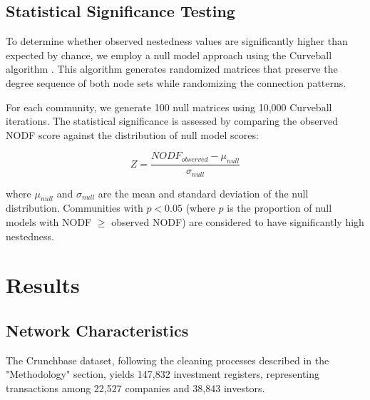 \documentclass[12pt]{article}
\begin{document}
\subsection{Statistical Significance Testing}

To determine whether observed nestedness values are significantly higher than expected by chance, we employ a null model approach using the Curveball algorithm \cite{Strona2014}. This algorithm generates randomized matrices that preserve the degree sequence of both node sets while randomizing the connection patterns.

For each community, we generate 100 null matrices using 10,000 Curveball iterations. The statistical significance is assessed by comparing the observed NODF score against the distribution of null model scores:


\begin{equation}
Z = \frac{NODF_{observed} - \mu_{null}}{\sigma_{null}}
\end{equation}

where $\mu_{null}$ and $\sigma_{null}$ are the mean and standard deviation of the null distribution. Communities with $p < 0.05$ (where $p$ is the proportion of null models with NODF $\geq$ observed NODF) are considered to have significantly high nestedness.


\section{Results}

\subsection{Network Characteristics}

\newcommand{\numCompanies}{22,527}
\newcommand{\numInvestors}{38,843}
\newcommand{\numInvestments}{147,832}
\newcommand{\numFundingRounds}{268,283}

The Crunchbase dataset, following the cleaning processes described in the "Methodology" section, yields \numInvestments{} investment registers, representing transactions among \numCompanies{} companies and \numInvestors{} investors.


\newcommand{\numVCInvestments}{104,618}
\newcommand{\numCompaniesWithVCFund}{16,932}
\end{document}
